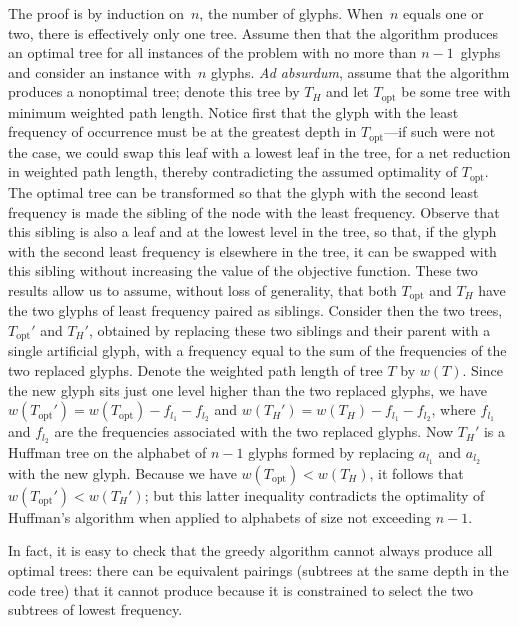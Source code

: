 \documentclass[11pt]{article}
\begin{document}
The proof is by induction on~$n$, the number of glyphs.  When~$n$ equals one or
two, there is effectively only one tree.  Assume then that the algorithm
produces an optimal tree for all instances of the problem with no more than
$n-1$~glyphs and consider an instance with~$n$ glyphs.  \emph{Ad absurdum},
assume that the algorithm produces a nonoptimal tree; denote this tree by $T_H$
and let $T_{\text{opt}}$ be some tree with minimum weighted path length.
Notice first that the glyph with the least frequency of occurrence must be at
the greatest depth in $T_{\text{opt}}$---if such were not the case, we could
swap this leaf with a lowest leaf in the tree, for a net reduction in weighted
path length, thereby contradicting the assumed optimality of $T_{\text{opt}}$.
The optimal tree can be transformed so that the glyph with the second least
frequency is made the sibling of the node with the least frequency.  Observe
that this sibling is also a leaf and at the lowest level in the tree, so that,
if the glyph with the second least frequency is elsewhere in the tree, it can
be swapped with this sibling without increasing the value of the objective
function.  These two results allow us to assume, without loss of generality,
that both $T_{\text{opt}}$ and $T_H$ have the two glyphs of least frequency
paired as siblings.  Consider then the two trees, $T_{\text{opt}}'$ and $T_H'$,
obtained by replacing these two siblings and their parent with a single
artificial glyph, with a frequency equal to the sum of the frequencies of the
two replaced glyphs.  Denote the weighted path length of tree $T$ by $w(T)$.
Since the new glyph sits just one level higher than the two replaced glyphs, we
have $w(T_{\text{opt}}')=w(T_{\text{opt}})-f_{l_1}-f_{l_2}$ and
$w(T_H')=w(T_H)-f_{l_1}-f_{l_2}$, where $f_{l_1}$ and $f_{l_2}$ are the
frequencies associated with the two replaced glyphs.  Now $T_H'$ is a Huffman
tree on the alphabet of $n-1$ glyphs formed by replacing $a_{l_1}$ and
$a_{l_2}$ with the new glyph.  Because we have $w(T_{\text{opt}}) < w(T_H)$, it
follows that $w(T_{\text{opt}}') < w(T_H')$; but this latter inequality
contradicts the optimality of Huffman's algorithm when applied to alphabets of
size not exceeding $n-1$.

\newpage
In fact, it is easy to check that the greedy algorithm cannot always produce
all optimal trees: there can be equivalent pairings (subtrees at the same
depth in the code tree) that it cannot produce because it is constrained
to select the two subtrees of lowest frequency.
\end{document}
